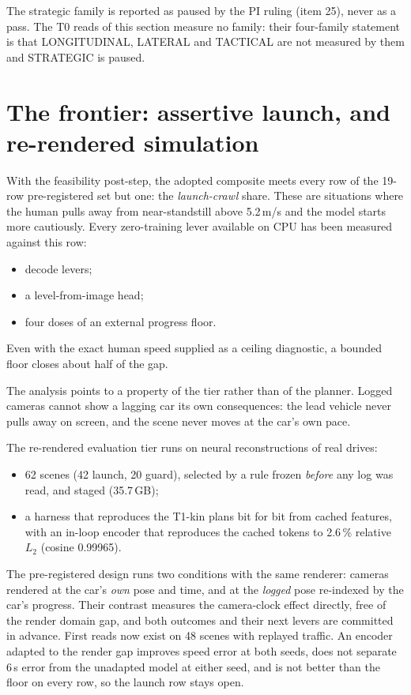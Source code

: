 \documentclass[10pt,twocolumn]{article}
\makeatletter
\theoremstyle{remark}
\newcommand{\tier}[1]{\textsc{\small #1}}
\renewcommand\paragraph{\@startsection{paragraph}{4}{\z@}{1.6ex \@plus .5ex \@minus .2ex}{-1em}{\normalfont\normalsize\bfseries}}
\makeatother
\begin{document}
The strategic family is reported as paused by the PI ruling (item 25), never as a pass. The \tier{T0} reads of this section measure no
family: their four-family statement is that LONGITUDINAL, LATERAL and TACTICAL are not measured by them and STRATEGIC is paused.

\section{The frontier: assertive launch, and re-rendered simulation}\label{sec:frontier}
With the feasibility post-step, the adopted composite meets every row of the 19-row pre-registered set but one: the \emph{launch-crawl}
share. These are situations where the human pulls away from near-standstill above 5.2\,m/s and the model starts more cautiously.
Every zero-training lever available on CPU has been measured against this row:
\begin{itemize}
  \item decode levers;
  \item a level-from-image head;
  \item four doses of an external progress floor.
\end{itemize}
Even with the exact human speed supplied as a ceiling diagnostic, a bounded floor closes about half of the gap.

The analysis points to a property of the tier rather than of the planner. Logged cameras cannot show a lagging car its own
consequences: the lead vehicle never pulls away on screen, and the scene never moves at the car's own pace.

\paragraph{T2 re-perception.} The re-rendered evaluation tier runs on neural reconstructions of real drives:
\begin{itemize}
  \item 62 scenes (42 launch, 20 guard), selected by a rule frozen \emph{before} any log was read, and staged (35.7\,GB);
  \item a harness that reproduces the T1-kin plans bit for bit from cached features, with an in-loop encoder that reproduces the
        cached tokens to 2.6\,\% relative $L_2$ (cosine 0.99965).
\end{itemize}
The pre-registered design runs two conditions with the same renderer: cameras rendered at the car's \emph{own} pose and time, and at
the \emph{logged} pose re-indexed by the car's progress. Their contrast measures the camera-clock effect directly, free of the
render domain gap, and both outcomes and their next levers are committed in advance. First reads now exist on 48 scenes with replayed
traffic. An encoder adapted to the render gap improves speed error at both seeds, does not separate 6\,s error from the unadapted model at
either seed, and is not better than the floor on every row, so the launch row stays open.
\end{document}
